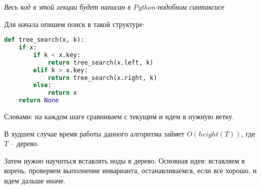 \documentclass[../main.tex]{subfiles}
\begin{document}
	 \begin{center}
	 \end{center}

	\textit{Весь код в этой лекции будет написан в Python-подобном синтаксисе}	
	
	Для начала опишем поиск в такой структуре:
	\begin{lstlisting}[language=python]
def tree_search(x, k):
    if x:
        if k < x.key:
            return tree_search(x.left, k)
        elif k > x.key:
            return tree_search(x.right, k)
        else:
            return x
    return None
	\end{lstlisting}
	
	Словами: на каждом шаге сравниваем с текущим и идем в нужную ветку.
	
	\begin{time}
		В худшем случае время работы данного алгоритма займет $O(height(T))$, где $T$ -- дерево.
	\end{time}
	
	Затем нужно научиться вставлять ноды в дерево. Основная идея: вставляем в корень, проверяем выполнение инварианта, останавливаемся, если все хорошо, и идем дальше иначе. 
	
\end{document}

